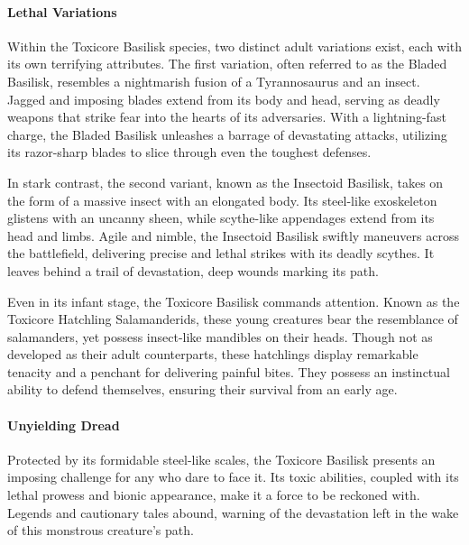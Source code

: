 \paragraph{Lethal Variations} Within the Toxicore Basilisk species, two distinct adult variations exist, each with its own terrifying attributes. The first variation, often referred to as the Bladed Basilisk, resembles a nightmarish fusion of a Tyrannosaurus and an insect. Jagged and imposing blades extend from its body and head, serving as deadly weapons that strike fear into the hearts of its adversaries. With a lightning-fast charge, the Bladed Basilisk unleashes a barrage of devastating attacks, utilizing its razor-sharp blades to slice through even the toughest defenses.

In stark contrast, the second variant, known as the Insectoid Basilisk, takes on the form of a massive insect with an elongated body. Its steel-like exoskeleton glistens with an uncanny sheen, while scythe-like appendages extend from its head and limbs. Agile and nimble, the Insectoid Basilisk swiftly maneuvers across the battlefield, delivering precise and lethal strikes with its deadly scythes. It leaves behind a trail of devastation, deep wounds marking its path.

Even in its infant stage, the Toxicore Basilisk commands attention. Known as the Toxicore Hatchling Salamanderids, these young creatures bear the resemblance of salamanders, yet possess insect-like mandibles on their heads. Though not as developed as their adult counterparts, these hatchlings display remarkable tenacity and a penchant for delivering painful bites. They possess an instinctual ability to defend themselves, ensuring their survival from an early age.

\paragraph{Unyielding Dread} Protected by its formidable steel-like scales, the Toxicore Basilisk presents an imposing challenge for any who dare to face it. Its toxic abilities, coupled with its lethal prowess and bionic appearance, make it a force to be reckoned with. Legends and cautionary tales abound, warning of the devastation left in the wake of this monstrous creature's path.

\vfill\eject %

